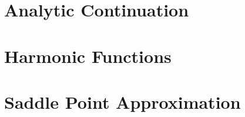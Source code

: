 \documentclass[../complete.tex]{subfiles}
\begin{document}
\section{Analytic Continuation}
\section{Harmonic Functions}
\section{Saddle Point Approximation}
\end{document}
